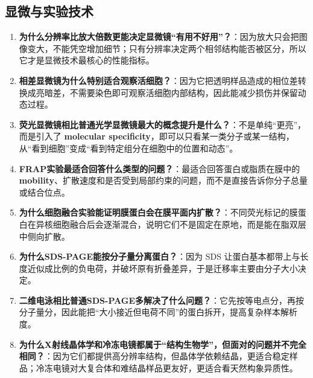 \documentclass[12pt,fontset=none]{ctexart}
\begin{document}
\subsection*{显微与实验技术}
\begin{enumerate}
\item \textbf{为什么分辨率比放大倍数更能决定显微镜“有用不好用”？}：因为放大只会把图像变大，不能凭空增加细节；只有分辨率决定两个相邻结构能否被区分，所以它才是显微技术最核心的性能指标。

\item \textbf{相差显微镜为什么特别适合观察活细胞？}：因为它把透明样品造成的相位差转换成亮暗差，不需要染色即可观察活细胞内部结构，因此能减少损伤并保留动态过程。

\item \textbf{荧光显微镜相比普通光学显微镜最大的概念提升是什么？}：不是单纯“更亮”，而是引入了 \textbf{molecular specificity}，即可以只看某一类分子或某一结构，从“看到细胞”变成“看到特定组分在细胞中的位置和动态”。

\item \textbf{FRAP实验最适合回答什么类型的问题？}：最适合回答蛋白或脂质在膜中的 \textbf{mobility}、扩散速度和是否受到局部约束的问题，而不是直接告诉你分子总量或结合位点。

\item \textbf{为什么细胞融合实验能证明膜蛋白会在膜平面内扩散？}：不同荧光标记的膜蛋白在异核细胞融合后会逐渐混合，说明它们不是固定在原地，而是能在脂双层中侧向扩散。

\item \textbf{为什么SDS-PAGE能按分子量分离蛋白？}：因为 SDS 让蛋白基本都带上与长度近似成比例的负电荷，并破坏原有折叠差异，于是迁移率主要由分子大小决定。

\item \textbf{二维电泳相比普通SDS-PAGE多解决了什么问题？}：它先按等电点分，再按分子量分，因此能把“大小接近但电荷不同”的蛋白拆开，提高复杂样本解析度。

\item \textbf{为什么X射线晶体学和冷冻电镜都属于“结构生物学”，但面对的问题并不完全相同？}：因为它们都提供高分辨率结构，但晶体学依赖结晶，更适合稳定样品；冷冻电镜对大复合体和难结晶样品更友好，更适合看天然构象异质性。
\end{enumerate}

\end{document}

